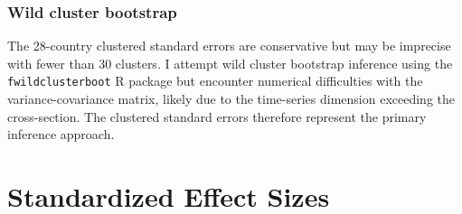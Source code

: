 \documentclass[12pt]{article}
\begin{document}
\subsubsection*{Wild cluster bootstrap} The 28-country clustered standard errors are conservative but may be imprecise with fewer than 30 clusters. I attempt wild cluster bootstrap inference using the \texttt{fwildclusterboot} R package but encounter numerical difficulties with the variance-covariance matrix, likely due to the time-series dimension exceeding the cross-section. The clustered standard errors therefore represent the primary inference approach.


\section{Standardized Effect Sizes}
\label{sec:sde}


\end{document}
